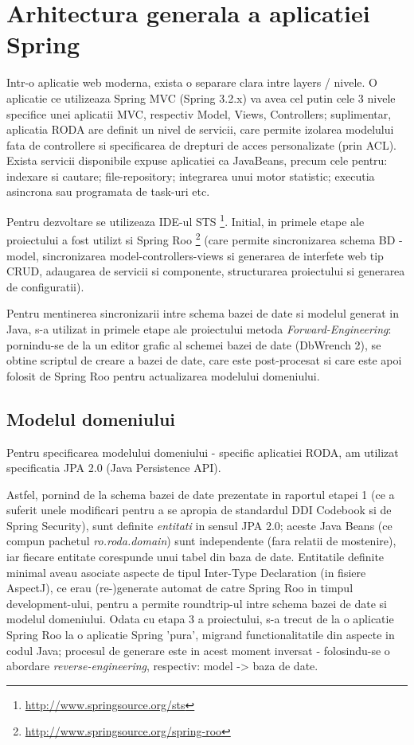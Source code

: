 \section{Arhitectura generala a aplicatiei Spring}

Intr-o aplicatie web moderna, exista o separare clara intre layers /
nivele. O aplicatie ce utilizeaza Spring MVC (Spring 3.2.x) va avea cel putin
cele 3 nivele specifice unei aplicatii MVC, respectiv Model, Views, Controllers; 
suplimentar, aplicatia RODA are definit un nivel de servicii, 
care permite izolarea modelului fata de controllere si specificarea de drepturi de acces personalizate (prin ACL). 
Exista servicii disponibile expuse aplicatiei ca JavaBeans, precum cele pentru: 
indexare si cautare; file-repository; 
integrarea unui motor statistic; 
executia asincrona sau programata de task-uri etc.


Pentru dezvoltare se utilizeaza IDE-ul STS
\footnote{\url{http://www.springsource.org/sts}}.
Initial, in primele etape ale proiectului a fost utilizt si Spring Roo
\footnote{\url{http://www.springsource.org/spring-roo}}
(care permite sincronizarea schema BD - model, sincronizarea model-controllers-views si generarea de
interfete web tip CRUD, adaugarea de servicii si componente, structurarea proiectului si generarea de configuratii).

Pentru mentinerea sincronizarii intre schema bazei de date si modelul generat
in Java, s-a utilizat in primele etape ale proiectului metoda \emph{Forward-Engineering}: 
pornindu-se de la un editor grafic al schemei bazei de date (DbWrench 2), %
se obtine scriptul de creare a bazei de date, 
care este post-procesat si care este apoi folosit de Spring Roo pentru
actualizarea modelului domeniului.

\subsection{Modelul domeniului}
Pentru specificarea modelului domeniului - specific aplicatiei RODA, 
am utilizat specificatia JPA 2.0 (Java Persistence API).

Astfel, pornind de la schema bazei de date prezentate in raportul etapei 1 (ce
a suferit unele modificari pentru a se apropia de standardul DDI Codebook si
de Spring Security), sunt definite \emph{entitati} in sensul JPA 2.0; 
aceste Java Beans (ce compun pachetul \emph{ro.roda.domain}) 
sunt independente (fara relatii de mostenire),
iar fiecare entitate corespunde unui tabel din baza de date. 
Entitatile definite minimal aveau asociate 
aspecte de tipul Inter-Type Declaration (in fisiere AspectJ), 
ce erau (re-)generate automat de catre Spring Roo in timpul development-ului, 
pentru a permite roundtrip-ul intre schema bazei de date si modelul domeniului.
Odata cu etapa 3 a proiectului, s-a trecut de la o aplicatie Spring Roo 
la o aplicatie Spring 'pura', 
migrand functionalitatile din aspecte in codul Java; 
procesul de generare este in acest moment inversat - 
folosindu-se o abordare \emph{reverse-engineering}, respectiv: model -> baza de date. %


